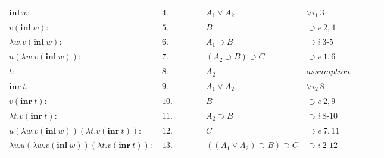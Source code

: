 \documentclass[11pt,a4paper]{article}
\begin{document}
\begin{itemize}
\begin{table}[H]
\begin{tabular}{*{10}{l}}
			$\textbf{inl} \ w:$ & $4.$ & \multicolumn{1}{|c}{} & \multicolumn{1}{|c}{} &  & $A_1 \lor A_2$ & $\lor i_1 \ 3$ & & \multicolumn{1}{c|}{} &\multicolumn{1}{c|}{}\\
			
			$v(\textbf{inl} \ w):$ & $5.$ & \multicolumn{1}{|c}{} & \multicolumn{1}{|c}{} &  & $B$ & $\supset e \ 2, 4$ & & \multicolumn{1}{c|}{} &\multicolumn{1}{c|}{}\\
			
			\cline{4-9}
			
			$\lambda w . v(\textbf{inl} \ w):$ & $6.$ & \multicolumn{1}{|c}{} & & & $A_1 \supset B$ & $\supset i \ 3$-$5$ & & & \multicolumn{1}{c|}{}\\
			
			$u(\lambda w . v(\textbf{inl} \ w)):$ & $7.$ & \multicolumn{1}{|c}{} & & & $(A_2 \supset B) \supset C$ & $\supset e \ 1, 6$ & & & \multicolumn{1}{c|}{}\\
			
			\cline{4-9}
			
			$t:$ & $8.$ & \multicolumn{1}{|c}{} & \multicolumn{1}{|c}{} &  & $A_2$ & $assumption$ & & \multicolumn{1}{c|}{} &\multicolumn{1}{c|}{}\\
			
			$\textbf{inr} \ t:$ & $9.$ & \multicolumn{1}{|c}{} & \multicolumn{1}{|c}{} &  & $A_1 \lor A_2$ & $\lor i_2 \ 8$ & & \multicolumn{1}{c|}{} &\multicolumn{1}{c|}{}\\
			
			$v(\textbf{inr} \ t):$ & $10.$ & \multicolumn{1}{|c}{} & \multicolumn{1}{|c}{} &  & $B$ & $\supset e \ 2, 9$ & & \multicolumn{1}{c|}{} &\multicolumn{1}{c|}{}\\
			
			\cline{4-9}
			
			$\lambda t . v(\textbf{inr} \ t):$ & $11.$ & \multicolumn{1}{|c}{} & & & $A_2 \supset B$ & $\supset i \ 8$-$10$ & & & \multicolumn{1}{c|}{}\\
			
			$u(\lambda w . v(\textbf{inl} \ w))(\lambda t . v(\textbf{inr} \ t)):$ & $12.$ & \multicolumn{1}{|c}{} & & & $C$ & $\supset e \ 7, 11$ & & & \multicolumn{1}{c|}{}\\
					
			\cline{3-10}
			
			$\lambda v . u(\lambda w . v(\textbf{inl} \ w))(\lambda t . v(\textbf{inr} \ t)):$ & $13.$ & & & & $((A_1 \vee A_2) \supset B) \supset C$ & $\supset i \ 2$-$12$ & & & \\
			

\end{tabular}
\end{table}
\end{itemize}
\end{document}
